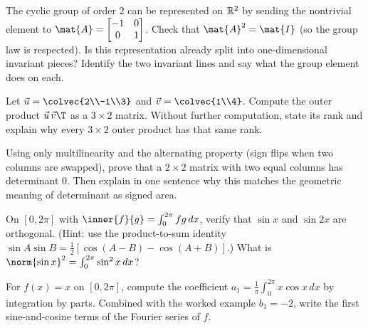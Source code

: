 \begin{exercise}
\label{ch37:ex-reptwo}
The cyclic group of order $2$ can be represented on $\mathbb{R}^2$ by sending the nontrivial
element to $\mat{A}=\begin{bmatrix}-1&0\\0&1\end{bmatrix}$. Check that $\mat{A}^2
=\mat{I}$ (so the group law is respected). Is this representation already split into
one-dimensional invariant pieces? Identify the two invariant lines and say what the
group element does on each.
\end{exercise}

\begin{exercise}
\label{ch37:ex-outer}
Let $\vec{u}=\colvec{2\\-1\\3}$ and $\vec{v}=\colvec{1\\4}$. Compute the outer
product $\vec{u}\,\vec{v}\T$ as a $3\times 2$ matrix. Without further computation,
state its rank and explain why every $3\times 2$ outer product has that same rank.
\end{exercise}

\begin{exercise}
\label{ch37:ex-altdet}
Using only multilinearity and the alternating property (sign flips when two columns
are swapped), prove that a $2\times 2$ matrix with two equal columns has determinant
$0$. Then explain in one sentence why this matches the geometric meaning of
determinant as signed area.
\end{exercise}

\begin{exercise}
\label{ch37:ex-orthfun2}
On $[0,2\pi]$ with $\inner{f}{g}=\int_0^{2\pi}fg\,dx$, verify that $\sin x$ and
$\sin 2x$ are orthogonal. (Hint: use the product-to-sum identity $\sin A\sin B
=\tfrac12[\cos(A-B)-\cos(A+B)]$.) What is $\norm{\sin x}^2=\int_0^{2\pi}\sin^2 x\,dx$?
\end{exercise}

\begin{exercise}
\label{ch37:ex-fouriercoef}
For $f(x)=x$ on $[0,2\pi]$, compute the coefficient $a_1=\frac1\pi\int_0^{2\pi}
x\cos x\,dx$ by integration by parts. Combined with the worked example $b_1=-2$,
write the first sine-and-cosine terms of the Fourier series of $f$.
\end{exercise}

